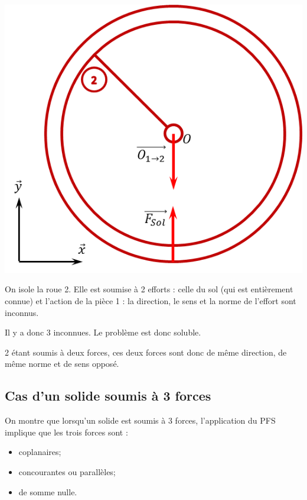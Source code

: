\documentclass[11pt,oneside]{article}
\begin{document}
\begin{exemple}
\begin{minipage}[c]{.2\linewidth}
\begin{center}
\includegraphics[width=.95\textwidth]{png/2F}
\end{center}
\end{minipage}
\hfill
\begin{minipage}[c]{.75\linewidth}
On isole la roue 2. Elle est soumise à 2 efforts : celle du sol (qui est entièrement connue) et l'action de la pièce 1 : la direction, le sens et la norme de l'effort sont inconnus. 

Il y a donc 3 inconnues. Le problème est donc soluble. 

2 étant soumis à deux forces, ces deux forces sont donc de même direction, de même norme et de sens opposé. 
\end{minipage}
\end{exemple}
\subsection{Cas d'un solide soumis à 3 forces}
\begin{resultat}
On montre que lorsqu'un solide est soumis à 3 forces, l'application du PFS implique que les trois forces sont : 
\begin{itemize}
\item coplanaires;
\item concourantes ou parallèles;
\item de somme nulle.
\end{itemize}
\end{resultat}
\end{document}
